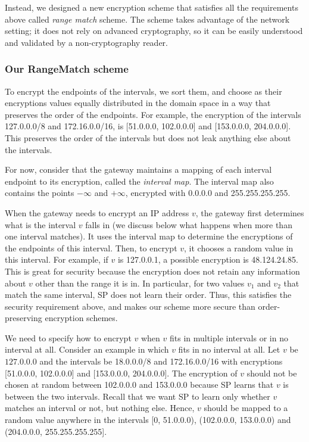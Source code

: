 Instead, we designed a new encryption scheme that satisfies all the requirements above called {\em range match} scheme. 
The scheme takes advantage of the network setting; it does not rely on advanced cryptography, so it can be easily understood and validated by a non-cryptography reader. 


\subsubsection{Our RangeMatch scheme} 




To encrypt the endpoints of the intervals, we sort them, and choose as their encryptions values equally distributed in the domain space in a way that preserves the order of the endpoints. For example, the encryption of the intervals 127.0.0.0/8 and 172.16.0.0/16, is [51.0.0.0, 102.0.0.0] and [153.0.0.0, 204.0.0.0]. This preserves the order of the intervals but does not leak anything else about the intervals.

For now, consider that the gateway  maintains a mapping of each interval endpoint  to its encryption, called the {\em interval map}.  The interval map also contains the points $- \infty$ and $+ \infty$, encrypted with 0.0.0.0 and 255.255.255.255. 


When the gateway needs to encrypt an IP address $v$, the gateway first determines what  is the interval  $v$ falls in (we discuss below what happens when more than one interval matches). It uses the interval map to determine the encryptions of the endpoints of this interval. Then, to encrypt $v$, it chooses a random value in this interval.
For example, if $v$ is 127.0.0.1, a possible encryption is 48.124.24.85. This is great for security because the encryption does not retain any information about $v$ other than the range it is in. In particular, for two values $v_1$ and $v_2$ that match the same interval, SP does not learn their order. Thus, this satisfies the security requirement above, and makes our scheme more secure than order-preserving encryption schemes.

We need to specify how to encrypt $v$ when $v$ fits in multiple intervals or in no interval at all. Consider an example in which $v$ fits in no interval at all. Let $v$ be $127.0.0.0$ and the intervals be 18.0.0.0/8 and 172.16.0.0/16 with encryptions [51.0.0.0, 102.0.0.0] and [153.0.0.0, 204.0.0.0]. The encryption of $v$ should not be chosen at random between  102.0.0.0 and 153.0.0.0 because SP learns that $v$ is between the two intervals. Recall that we want SP  to learn only whether $v$ matches an interval or not, but nothing else. Hence, $v$ should be mapped to a random value anywhere in the intervals [0, 51.0.0.0), (102.0.0.0, 153.0.0.0) and (204.0.0.0, 255.255.255.255]. 

